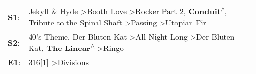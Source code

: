 \begin{supertabular}{p{0.03\textwidth}p{0.92\textwidth}}
 \textbf{S1}:  &  Jekyll \& Hyde\textsuperscript{} \textgreater \enspace Booth Love\textsuperscript{} \textgreater \enspace Rocker Part 2\textsuperscript{}, \enspace \textbf{Conduit\textsuperscript{$\wedge$}}, \enspace Tribute to the Spinal Shaft\textsuperscript{} \textgreater \enspace Passing\textsuperscript{} \textgreater \enspace Utopian Fir\textsuperscript{}  \enspace  \\
 \textbf{S2}:  &                                                                 40's Theme\textsuperscript{}, \enspace Der Bluten Kat\textsuperscript{} \textgreater \enspace All Night Long\textsuperscript{} \textgreater \enspace Der Bluten Kat\textsuperscript{}, \enspace \textbf{The Linear\textsuperscript{$\wedge$}} \textgreater \enspace Ringo\textsuperscript{}  \enspace  \\
 \textbf{E1}:  &                                                                                                                                                                                                                                                                                  316[1]\textsuperscript{} \textgreater \enspace Divisions\textsuperscript{}  \enspace  \\
\end{supertabular}
